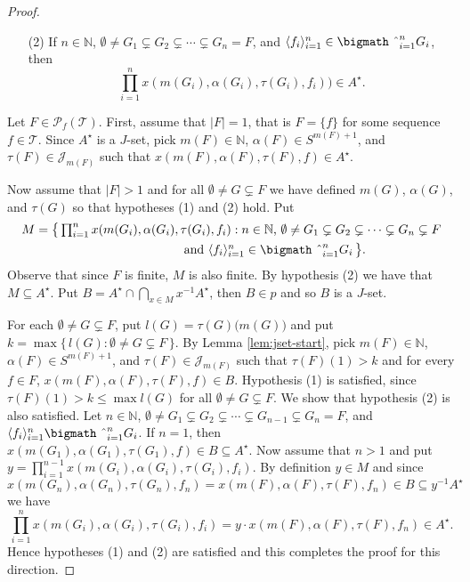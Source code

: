 \documentclass[12pt,showtrims]{memoir}
\theoremstyle{plain}
\theoremstyle{definition}
\newcommand{\la}{\langle}
\newcommand{\ra}{\rangle}
\newcommand{\bbN}{\mathbb{N}}
\newcommand{\calJ}{\mathcal{J}}
\newcommand{\calT}{\mathcal{T}}
\newcommand{\Pf}{\mathcal{P}_f}
\newcommand{\bigtimes}{\hbox{\bigmath \char'2}}
\begin{document}
\begin{proof}
\begin{itemize}
    \item[(2)] If $n \in \bbN$, $\emptyset \ne G_1 \subsetneq G_2 \subsetneq \cdots \subsetneq G_n = F$, and $\la f_i \ra_{i=1}^n \in \bigtimes_{i=1}^n G_i$, then \[\textstyle \prod_{i=1}^n x(m(G_i), \alpha(G_i), \tau(G_i), f_i)) \in A^\star.\]
  \end{itemize}

  Let $F \in \Pf(\calT)$.
  First, assume that $|F| = 1$, that is $F = \{f\}$ for some sequence $f \in \calT$.
  Since $A^\star$ is a $J$-set, pick $m(F) \in \bbN$, $\alpha(F) \in S^{m(F)+1}$, and $\tau(F) \in \calJ_{m(F)}$ such that $x(m(F), \alpha(F), \tau(F), f) \in A^\star$. 

  Now assume that $|F| > 1$ and for all $\emptyset \ne G \subsetneq F$ we have defined $m(G)$, $\alpha(G)$, and $\tau(G)$ so that hypotheses (1) and (2) hold.
  Put 
  \begin{align*}
    M &= \bigl\{\, \textstyle \prod_{i=1}^n x(m(G_i), \alpha(G_i), \tau(G_i), f_i) : \mbox{$n \in \bbN$, $\emptyset \ne G_1 \subsetneq G_2 \subsetneq \cdots \subsetneq G_n \subsetneq F$} \\
    &\hspace{12em} \mbox{and $\la f_i \ra_{i=1}^n \in \bigtimes_{i=1}^n G_i$} \,\bigr\}.
  \end{align*}
  Observe that since $F$ is finite, $M$ is also finite.
  By hypothesis (2) we have that $M \subseteq A^\star$.
  Put $B = A^\star \cap \bigcap_{x \in M} x^{-1}A^\star$, then $B \in p$ and so $B$ is a $J$-set. 

  For each $\emptyset \ne G \subsetneq F$, put $l(G) = \tau(G)\bigl( m(G) \bigr)$ and put $k = \max\{\, l(G) : \emptyset \ne G \subsetneq F \,\}$.
  By Lemma \ref{lem:jset-start}, pick $m(F) \in \bbN$, $\alpha(F) \in S^{m(F)+1}$, and $\tau(F) \in \calJ_{m(F)}$ such that $\tau(F)(1) > k$ and for every $f \in F$, $x(m(F), \alpha(F), \tau(F), f) \in B$.
  Hypothesis (1) is satisfied, since $\tau(F)(1) > k \le \max l(G)$ for all $\emptyset \ne G \subsetneq F$.
  We show that hypothesis (2) is also satisfied.
  Let $n \in \bbN$, $\emptyset \ne G_1 \subsetneq G_2 \subsetneq \cdots \subsetneq G_{n-1} \subsetneq G_n = F$, and $\la f_i \ra_{i=1}^n \bigtimes_{i=1}^n G_i$. 
  If $n = 1$, then $x(m(G_1), \alpha(G_1), \tau(G_1), f) \in B \subseteq A^\star$.
  Now assume that $n > 1$ and put $y = \prod_{i=1}^{n-1} x(m(G_i), \alpha(G_i), \tau(G_i), f_i)$. 
  By definition $y \in M$ and since $x(m(G_n), \alpha(G_n), \tau(G_n), f_n) = x(m(F), \alpha(F), \tau(F), f_n) \in B \subseteq y^{-1}A^\star$ we have
  \[
    \textstyle
    \prod_{i=1}^n x(m(G_i), \alpha(G_i), \tau(G_i), f_i) = y \cdot x(m(F), \alpha(F), \tau(F), f_n) \in A^\star.
  \]
  Hence hypotheses (1) and (2) are satisfied and this completes the proof for this direction.
\end{proof}
\end{document}
